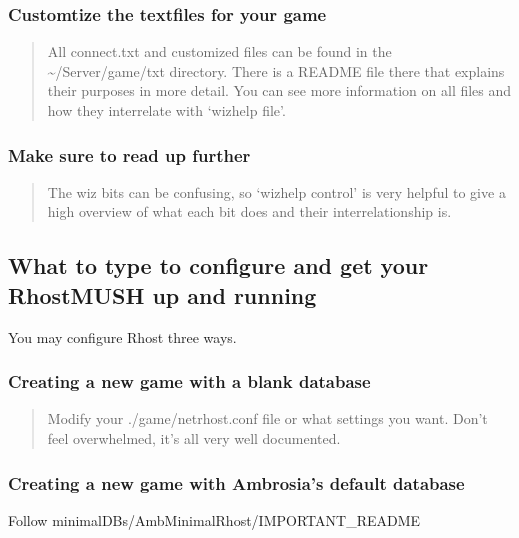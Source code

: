 \documentclass[letterpaper,10pt,english]{sphinxmanual}
\begin{document}
\subsubsection{Customtize the textfiles for your game}
\label{\detokenize{installation:customtize-the-textfiles-for-your-game}}\begin{quote}

\sphinxAtStartPar
All connect.txt and customized files can be found in the \textasciitilde{}/Server/game/txt directory.  There is a
README file there that explains their purposes in more detail.  You can see more information on
all files and how they inter\sphinxhyphen{}relate with ‘wizhelp file’.
\end{quote}


\subsubsection{Make sure to read up further}
\label{\detokenize{installation:make-sure-to-read-up-further}}\begin{quote}

\sphinxAtStartPar
The wiz bits can be confusing, so ‘wizhelp control’ is very helpful to give a high overview
of what each bit does and their inter\sphinxhyphen{}relationship is.
\end{quote}


\subsection{What to type to configure and get your RhostMUSH up and running}
\label{\detokenize{installation:what-to-type-to-configure-and-get-your-rhostmush-up-and-running}}
\sphinxAtStartPar
You may configure Rhost three ways.


\subsubsection{Creating a new game with a blank database}
\label{\detokenize{installation:creating-a-new-game-with-a-blank-database}}\begin{quote}

\sphinxAtStartPar
Modify your ./game/netrhost.conf file or what settings you want.
Don’t feel overwhelmed, it’s all very well documented.
\end{quote}


\subsubsection{Creating a new game with Ambrosia’s default database}
\label{\detokenize{installation:creating-a-new-game-with-ambrosia-s-default-database}}
\sphinxAtStartPar
Follow minimal\sphinxhyphen{}DBs/Amb\sphinxhyphen{}MinimalRhost/IMPORTANT\_README
\end{document}
